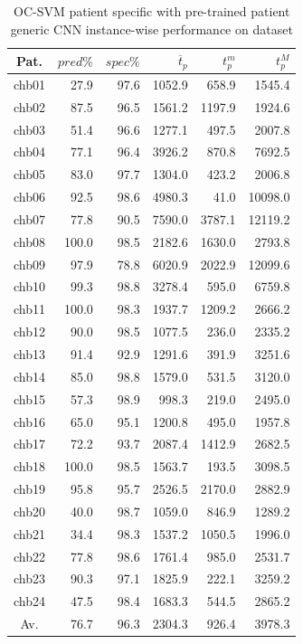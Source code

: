 \begin{table}[ht]
    \centering
    \begin{tabular}{c|rrrrr}
    Pat.  & $pred\%$ & $spec\%$ & $\overline{t}_p$   & $t_p^m$  & $t_p^M$   \\ \hline
    chb01   & 27.9   & 97.6   & 1052.9  & 658.9   & 1545.4  \\
    chb02   & 87.5   & 96.5   & 1561.2  & 1197.9  & 1924.6  \\
    chb03   & 51.4   & 96.6   & 1277.1  & 497.5   & 2007.8  \\
    chb04   & 77.1   & 96.4   & 3926.2  & 870.8   & 7692.5  \\
    chb05   & 83.0   & 97.7   & 1304.0  & 423.2   & 2006.8  \\
    chb06   & 92.5   & 98.6   & 4980.3  & 41.0    & 10098.0 \\
    chb07   & 77.8   & 90.5   & 7590.0  & 3787.1  & 12119.2 \\
    chb08   & 100.0  & 98.5   & 2182.6  & 1630.0  & 2793.8  \\
    chb09   & 97.9   & 78.8   & 6020.9  & 2022.9  & 12099.6 \\
    chb10   & 99.3   & 98.8   & 3278.4  & 595.0   & 6759.8  \\
    chb11   & 100.0  & 98.3   & 1937.7  & 1209.2  & 2666.2  \\
    chb12   & 90.0   & 98.5   & 1077.5  & 236.0   & 2335.2  \\
    chb13   & 91.4   & 92.9   & 1291.6  & 391.9   & 3251.6  \\
    chb14   & 85.0   & 98.8   & 1579.0  & 531.5   & 3120.0  \\
    chb15   & 57.3   & 98.9   & 998.3   & 219.0   & 2495.0  \\
    chb16   & 65.0   & 95.1   & 1200.8  & 495.0   & 1957.8  \\
    chb17   & 72.2   & 93.7   & 2087.4  & 1412.9  & 2682.5  \\
    chb18   & 100.0  & 98.5   & 1563.7  & 193.5   & 3098.5  \\
    chb19   & 95.8   & 95.7   & 2526.5  & 2170.0  & 2882.9  \\
    chb20   & 40.0   & 98.7   & 1059.0  & 846.9   & 1289.2  \\
    chb21   & 34.4   & 98.3   & 1537.2  & 1050.5  & 1996.0  \\
    chb22   & 77.8   & 98.6   & 1761.4  & 985.0   & 2531.7  \\
    chb23   & 90.3   & 97.1   & 1825.9  & 222.1   & 3259.2  \\
    chb24   & 47.5   & 98.4   & 1683.3  & 544.5   & 2865.2  \\ \hline
    Av.     & 76.7   & 96.3   & 2304.3  & 926.4   & 3978.3  \\ \hline
    \end{tabular}
    \caption{OC-SVM patient specific with pre-trained patient generic CNN instance-wise performance on  dataset}
    \label{tab:cnn-ocsvm-instance} 
\end{table}

